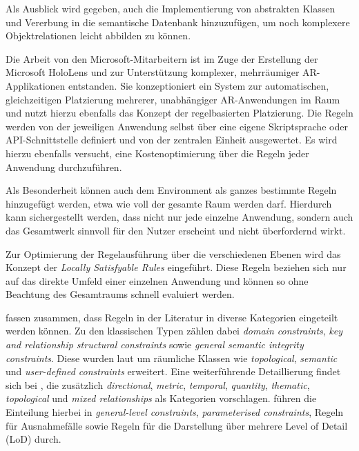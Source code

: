 Als Ausblick wird gegeben, auch die Implementierung von abstrakten Klassen und Vererbung in die semantische Datenbank hinzuzufügen, um noch komplexere Objektrelationen leicht abbilden zu können.

\medskip

Die Arbeit von den Microsoft-Mitarbeitern \textcite{galFLAREFastLayout2014} ist im Zuge der Erstellung der Microsoft HoloLens und zur Unterstützung komplexer, mehrräumiger AR-Applikationen entstanden. Sie konzeptioniert ein System zur automatischen, gleichzeitigen Platzierung mehrerer, unabhängiger AR-Anwendungen im Raum und nutzt hierzu ebenfalls das Konzept der regelbasierten Platzierung. Die Regeln werden von der jeweiligen Anwendung selbst über eine eigene Skriptsprache oder API-Schnittstelle definiert und von der zentralen Einheit ausgewertet. Es wird hierzu ebenfalls versucht, eine Kostenoptimierung über die Regeln jeder Anwendung durchzuführen.

Als Besonderheit können auch dem Environment als ganzes bestimmte Regeln hinzugefügt werden, etwa wie voll der gesamte Raum werden darf. Hierdurch kann sichergestellt werden, dass nicht nur jede einzelne Anwendung, sondern auch das Gesamtwerk sinnvoll für den Nutzer erscheint und nicht überfordernd wirkt.

Zur Optimierung der Regelausführung über die verschiedenen Ebenen wird das Konzept der \textit{Locally Satisfyable Rules} eingeführt. Diese Regeln beziehen sich nur auf das direkte Umfeld einer einzelnen Anwendung und können so ohne Beachtung des Gesamtraums schnell evaluiert werden.

\medskip

\textcite{xuMethodologyModelling3D2017} fassen zusammen, dass Regeln in der Literatur in diverse Kategorien eingeteilt werden können. Zu den klassischen Typen zählen dabei \textit{domain constraints}, \textit{key and relationship structural constraints} sowie \textit{general semantic integrity constraints}. Diese wurden laut \textcite{cockcroftTaxonomySpatialData1997} um räumliche Klassen wie \textit{topological}, \textit{semantic} und \textit{user-defined constraints} erweitert. Eine weiterführende Detaillierung findet sich bei \textcite{louwsmaSpecifyingImplementingConstraints2006}, die zusätzlich \textit{directional}, \textit{metric}, \textit{temporal}, \textit{quantity}, \textit{thematic}, \textit{topological} und \textit{mixed relationships} als Kategorien vorschlagen. \textcite{xuMethodologyModelling3D2017} führen die Einteilung hierbei in \textit{general-level constraints}, \textit{parameterised constraints}, Regeln für Ausnahmefälle sowie Regeln für die Darstellung über mehrere Level of Detail (LoD) durch.

